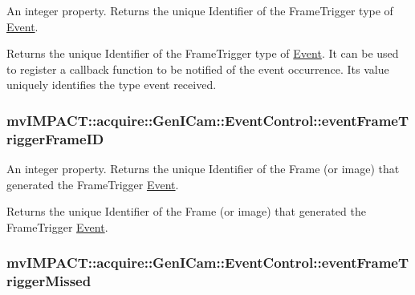 An integer property. Returns the unique Identifier of the Frame\+Trigger type of \hyperlink{classmv_i_m_p_a_c_t_1_1acquire_1_1_event}{Event}. 

Returns the unique Identifier of the Frame\+Trigger type of \hyperlink{classmv_i_m_p_a_c_t_1_1acquire_1_1_event}{Event}. It can be used to register a callback function to be notified of the event occurrence. Its value uniquely identifies the type event received. \hypertarget{classmv_i_m_p_a_c_t_1_1acquire_1_1_gen_i_cam_1_1_event_control_a9475d07bcbf0b1340f6545aaf34840e0}{
\subsubsection[{event\+Frame\+Trigger\+Frame\+I\+D}]{ mv\+I\+M\+P\+A\+C\+T\+::acquire\+::\+Gen\+I\+Cam\+::\+Event\+Control\+::event\+Frame\+Trigger\+Frame\+I\+D}}\label{classmv_i_m_p_a_c_t_1_1acquire_1_1_gen_i_cam_1_1_event_control_a9475d07bcbf0b1340f6545aaf34840e0}


An integer property. Returns the unique Identifier of the Frame (or image) that generated the Frame\+Trigger \hyperlink{classmv_i_m_p_a_c_t_1_1acquire_1_1_event}{Event}. 

Returns the unique Identifier of the Frame (or image) that generated the Frame\+Trigger \hyperlink{classmv_i_m_p_a_c_t_1_1acquire_1_1_event}{Event}. \hypertarget{classmv_i_m_p_a_c_t_1_1acquire_1_1_gen_i_cam_1_1_event_control_a2f17f3c4521724cc445820884e74c7d2}{
\subsubsection[{event\+Frame\+Trigger\+Missed}]{ mv\+I\+M\+P\+A\+C\+T\+::acquire\+::\+Gen\+I\+Cam\+::\+Event\+Control\+::event\+Frame\+Trigger\+Missed}}\label{classmv_i_m_p_a_c_t_1_1acquire_1_1_gen_i_cam_1_1_event_control_a2f17f3c4521724cc445820884e74c7d2}


